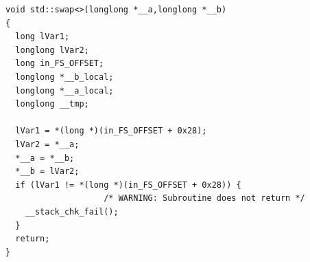 \documentclass[runningheads]{llncs}
\begin{document}
\begin{minipage}{0.95\linewidth}
\begin{verbatim}
void std::swap<>(longlong *__a,longlong *__b)
{
  long lVar1;
  longlong lVar2;
  long in_FS_OFFSET;
  longlong *__b_local;
  longlong *__a_local;
  longlong __tmp;
  
  lVar1 = *(long *)(in_FS_OFFSET + 0x28);
  lVar2 = *__a;
  *__a = *__b;
  *__b = lVar2;
  if (lVar1 != *(long *)(in_FS_OFFSET + 0x28)) {
                    /* WARNING: Subroutine does not return */
    __stack_chk_fail();
  }
  return;
}
\end{verbatim}
\label{apendice:swap-decompilation-with-depuration-info}
\end{minipage}
\end{document}
